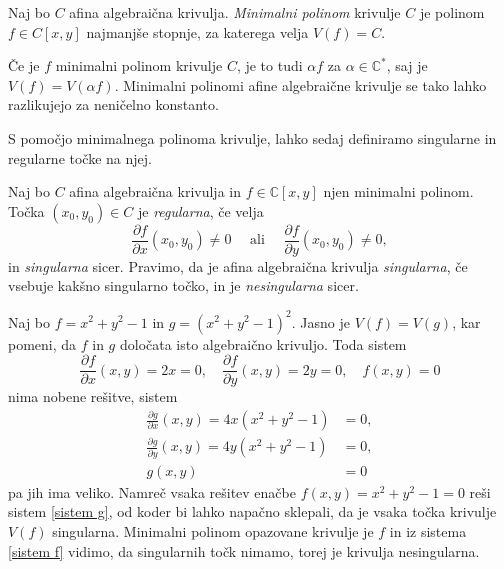\documentclass[mat1]{fmfdelo}
\numberwithin{equation}{section}
\newcommand{\C}{\mathbb C}
\newcommand{\CM}{\mathbb C ^*}
\newcommand{\pdv}[2][]{\frac{\partial#1}{\partial#2}}
\theoremstyle{definition}
\begin{document}
\begin{definicija}
    Naj bo $C$ afina algebraična krivulja. \emph{Minimalni polinom} krivulje $C$ je polinom $f \in C[x,y]$ najmanjše stopnje, za katerega velja $V(f) = C$.
\end{definicija}

\begin{opomba}
    Če je $f$ minimalni polinom krivulje $C$, je to tudi $\alpha f$ za $\alpha \in \CM$, saj je $V(f) = V(\alpha f)$. Minimalni polinomi afine algebraične krivulje se tako lahko razlikujejo za neničelno konstanto.
\end{opomba}


S pomočjo minimalnega polinoma krivulje, lahko sedaj definiramo singularne in regularne točke na njej.

\begin{definicija}
    \label{reg sing tocke}
    Naj bo $C$ afina algebraična krivulja in $f \in \C[x,y]$ njen minimalni polinom. Točka $(x_0, y_0) \in C$ je \emph{regularna}, če velja
    \[
        \frac{\partial f}{\partial x}(x_0, y_0) \neq 0 \quad \text{ ali } \quad \frac{\partial f}{\partial y}(x_0, y_0) \neq 0,
    \] 
    in \emph{singularna} sicer. Pravimo, da je afina algebraična krivulja \emph{singularna}, če vsebuje kakšno singularno točko, in je \emph{nesingularna} sicer.
\end{definicija}

\begin{primer*}
    Naj bo $f = x^2 + y^2 - 1$ in $g = (x^2 + y^2 - 1)^2$. Jasno je $V(f) = V(g)$, kar pomeni, da $f$ in $g$ določata isto algebraično krivuljo. Toda sistem 
    \begin{equation}
        \label{sistem f}
        \pdv[f]{x}(x,y) = 2x = 0, \quad \pdv[f]{y}(x,y) = 2y = 0, \quad f(x,y) = 0
    \end{equation}
    nima nobene rešitve, sistem
    \begin{align}
        \label{sistem g}
        \pdv[g]{x}(x,y) = 4x(x^2 + y^2 - 1) &= 0, \nonumber \\ 
        \pdv[g]{y}(x,y) = 4y(x^2 + y^2 - 1) &= 0, \\
        g(x,y) &= 0 \nonumber
    \end{align}
    pa jih ima veliko. Namreč vsaka rešitev enačbe $f(x,y) = x^2 + y^2 - 1 = 0$ reši sistem \eqref{sistem g}, od koder bi lahko napačno sklepali, da je vsaka točka krivulje $V(f)$ singularna. Minimalni polinom opazovane krivulje je $f$ in iz sistema \eqref{sistem f} vidimo, da singularnih točk nimamo, torej je krivulja nesingularna. 
    
\end{primer*}
\end{document}
